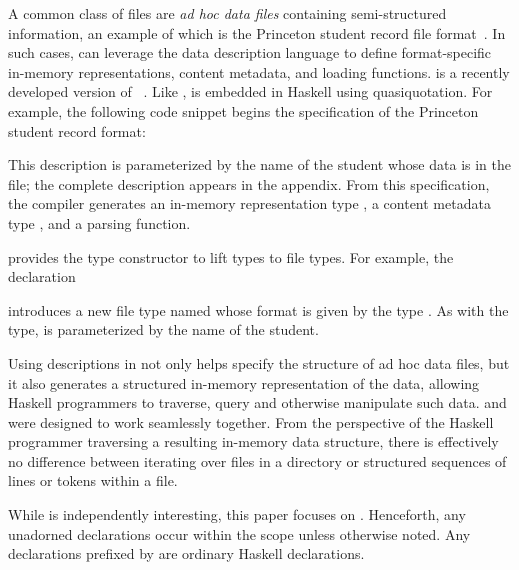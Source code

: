A common class of files are \textit{ad hoc data files} containing
semi-structured information, an example of which is the Princeton
student record file format\ifanon{}~\cite{pldi-aux-materials}\fi. 
In such cases, \forest{} can leverage the \padshaskell{} data
description language to define format-specific in-memory
representations, content metadata, and loading functions. 
\padshaskell{} is a recently developed version of 
\pads{}~\cite{fisher+:pads,fisher+:toplas,mandelbaum+:pads-ml}.
Like \forest{}, \padshaskell{} is embedded in Haskell using
quasiquotation.  For example, the following code snippet 
begins the \pads{} specification of the Princeton student record
format: 
\noindent
\begin{code}
[pads| \kw{data} Student(name::String) = <pads decl> |]
\end{code}
This description is parameterized by the name of the student whose
data is in the file; the complete description appears in the appendix.
From this specification, the \pads{} compiler
generates an in-memory representation type , a content metadata
type , and a parsing function.  

\forest{} provides the  type constructor to lift \pads{}
types to \forest{} file types.  For example, the declaration
\begin{code}
[forest| \kw{type} SFile(n::String) = File(Student n) |]
\end{code}
introduces a new file type named  whose format is given by
the \pads{} type .  As with the \pads{} type, 
is parameterized by the name of the student.  

Using \padshaskell{} descriptions in \forest{} not only helps specify
the structure of ad hoc data files, but it also generates a structured
in-memory representation of the data, allowing Haskell programmers to
traverse, query and otherwise manipulate such data.  
\padshaskell{} and \forest{} were designed to work seamlessly
together.  From the perspective of the Haskell programmer traversing
a resulting in-memory data structure, there is effectively no difference
between iterating over files in a directory or structured sequences of
lines or tokens within a file.

While \padshaskell{} is independently interesting,
this paper focuses on \forest{}.  Henceforth, any
unadorned declarations occur within the \forest{} scope
\cd{[forest|...|]} unless otherwise noted.  Any declarations prefixed
by \cd{>} 
are ordinary Haskell declarations.

